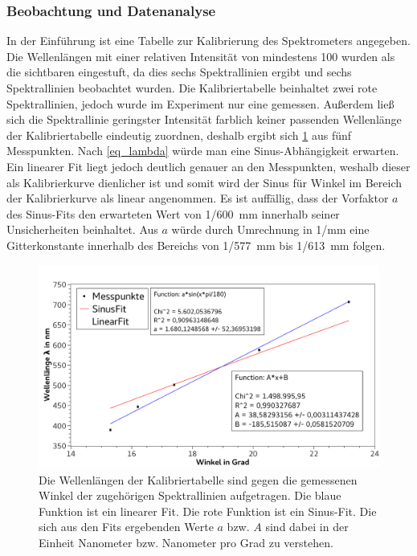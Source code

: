 \documentclass[
	a4paper,
	12pt,
	pagesize,
	ngerman
]{scrartcl}
\begin{document}
	\subsubsection{Beobachtung und Datenanalyse}
	In der Einführung ist eine Tabelle zur Kalibrierung des Spektrometers angegeben. %
	Die Wellenlängen mit einer relativen Intensität von mindestens 100 wurden als die sichtbaren eingestuft, da dies sechs Spektrallinien ergibt und sechs Spektrallinien beobachtet wurden.
	Die Kalibriertabelle beinhaltet zwei rote Spektrallinien, jedoch wurde im Experiment nur eine gemessen.
	Außerdem ließ sich die Spektrallinie geringster Intensität farblich keiner passenden Wellenlänge der Kalibriertabelle eindeutig zuordnen, deshalb ergibt sich \cref{fig_helium} aus fünf Messpunkten.
	Nach \cref{eq_lambda} würde man eine Sinus-Abhängigkeit erwarten. 
	Ein linearer Fit liegt jedoch deutlich genauer an den Messpunkten, weshalb dieser als Kalibrierkurve dienlicher ist und somit wird der Sinus für Winkel im Bereich der Kalibrierkurve als linear angenommen.
	Es ist auffällig, dass der Vorfaktor $a$ des Sinus-Fits den erwarteten Wert von 1/\SI{600}{mm} innerhalb seiner Unsicherheiten beinhaltet. 
	Aus $a$ würde durch Umrechnung in 1/\si{mm} eine Gitterkonstante innerhalb des Bereichs von 1/\SI{577}{mm} bis 1/\SI{613}{mm} folgen. %
	

	\begin{figure}[H] 
		\includegraphics[width=1\textwidth]{fig_helium} 
		\centering
		\caption{Die Wellenlängen der Kalibriertabelle sind gegen die gemessenen Winkel der zugehörigen Spektrallinien aufgetragen.
		Die blaue Funktion ist ein linearer Fit.
		Die rote Funktion ist ein Sinus-Fit.
		Die sich aus den Fits ergebenden Werte $a$ bzw. $A$ sind dabei in der Einheit Nanometer bzw. Nanometer pro Grad zu verstehen.}
		\label{fig_helium}
		\centering
	\end{figure}
\end{document}
